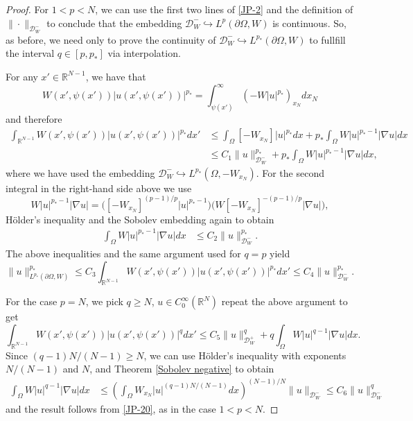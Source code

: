 \documentclass[12pt]{amsart}
\theoremstyle{definition}
\theoremstyle{plain}
\newcommand{\dint}{\int_{\Omega}}
\begin{document}
\begin{proof}
For $1<p<N$, we can use the first two lines of \eqref{JP-2} and the definition of $\|\cdot\|_{\mathcal{D}_W^-}$ to conclude that the embedding $\mathcal{D}_W^- \hookrightarrow L^p(\partial\Omega,W)$ is continuous. So,  as before, we need only to prove the continuity of $\mathcal{D}_W^- \hookrightarrow L^{p_*}(\partial\Omega,W)$ to fullfill the interval $q\in [p,p_*]$ via interpolation.

For any $x' \in \mathbb{R}^{N-1}$, we have that
$$
W(x',\psi(x'))|u(x',\psi(x'))|^{p_*}=\int_{\psi(x')}^{\infty}\left(-W|u|^{p_*}\right)_{x_N}dx_N		
$$        
and therefore
\begin{align*}
\int_{\mathbb{R}^{N-1}}W(x',\psi(x'))|u(x',\psi(x'))|^{p_*}dx' & \leq \dint [-W_{x_N}]|u|^{p_*}dx + p_*\dint W|u|^{p_*-1}|\nabla u|dx \\
& \leq C_1\|u\|^{p_*}_{\mathcal{D}_W^-} + p_*\dint W|u|^{p_*-1}|\nabla u|dx,
\end{align*}
where we have used the embedding $\mathcal{D}_W^- \hookrightarrow L^{p_*}(\Omega,-W_{x_N})$. For the second integral in the right-hand side above we use
        $$
        W|u|^{p_*-1}|\nabla u|= \Big( [-W_{x_N}]^{(p-1)/p}|u|^{p_*-1} \Big) \Big( W [-W_{x_N}]^{{-(p-1)/p}} |\nabla u|\Big),
        $$
        Hölder's inequality and the Sobolev embedding again to obtain
        \begin{align*}
			\dint W|u|^{p_*-1}|\nabla u|dx & \leq  C_2 \|u\|_{\mathcal{D}_W^-}^{p_*}.
		\end{align*}
        The above inequalities and the same argument used for $q=p$ yield
        $$
			\|u\|_{L^{p_*}(\partial\Omega,W)}^{p_*} \leq C_3\int_{\mathbb{R}^{N-1}} W(x',\psi(x'))|u(x',\psi(x'))|^{p_*} dx'  \leq C_4 \|u\|_{\mathcal{D}_W^-}^{p_*}.
		$$
        
    For the case $p=N$, we pick $q \geq N$,  $u \in C_0^\infty(\mathbb{R}^N)$ repeat the above argument to get
   	\begin{equation} \label{JP-20}
		 \int_{\mathbb{R}^{N-1}}W(x',\psi(x'))|u(x',\psi(x'))|^qdx' 
          \leq C_5\|u\|^q_{\mathcal{D}_W^+} + q \dint W|u|^{q-1}|\nabla u|dx. 
        \end{equation}
   Since $(q-1)N/(N-1)\geq N$, we can use 
        Hölder's inequality with exponents $N/(N-1)$ and $N$,  and Theorem \ref{Sobolev negative} to obtain
        \begin{align*}
			\dint W|u|^{q-1}|\nabla u|dx & \leq  \left(\dint W_{x_N}|u|^{(q-1)N/(N-1)}dx\right)^{(N-1)/N} \|u\|_{\mathcal{D}_W^-} \leq C_6 \|u\|_{\mathcal{D}_W^-}^q
		\end{align*}
        and the result follows from \eqref{JP-20}, as in the case $1<p<N$.
        \end{proof}
    
\end{document}
